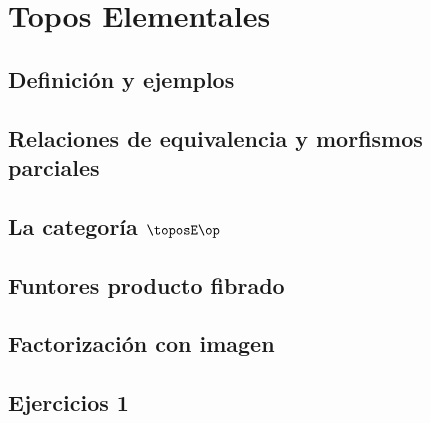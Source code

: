 \chapter{Topos Elementales}
\label{chap:topos_elementales}

\section{Definición y ejemplos}
\label{sec:definicion_ejemplos}

\section{Relaciones de equivalencia y morfismos parciales}
\label{sec:relaciones_equivalencia_morfismos_parciales}

\section{La categoría \(\toposE\op\)}
\label{sec:categoria_Eop}

\section{Funtores producto fibrado}
\label{sec:funtores_producto_fibrado}

\section{Factorización con imagen}
\label{sec:factorizacion_imagen}

\section*{Ejercicios 1}
\label{sec:ejercicios-1}
